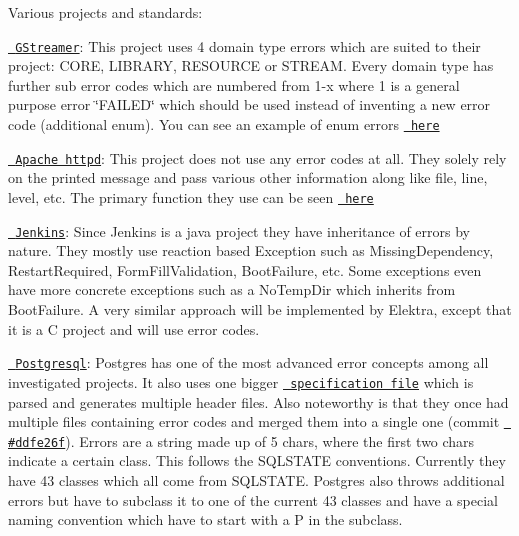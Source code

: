 Various projects and standards\+:


\begin{DoxyItemize}
\item \href{https://github.com/GStreamer/gstreamer}{\texttt{ G\+Streamer}}\+: This project uses 4 domain type errors which are suited to their project\+: C\+O\+RE, L\+I\+B\+R\+A\+RY, R\+E\+S\+O\+U\+R\+CE or S\+T\+R\+E\+AM. Every domain type has further sub error codes which are numbered from 1-\/x where 1 is a general purpose error \char`\"{}\+F\+A\+I\+L\+E\+D\char`\"{} which should be used instead of inventing a new error code (additional enum). You can see an example of enum errors \href{https://github.com/GStreamer/gstreamer/blob/a7db80f9a98287f012108845e121f6f6fb62171b/gst/gsterror.h\#L63-L80}{\texttt{ here}}
\item \href{https://github.com/apache/httpd}{\texttt{ Apache httpd}}\+: This project does not use any error codes at all. They solely rely on the printed message and pass various other information along like file, line, level, etc. The primary function they use can be seen \href{https://github.com/apache/httpd/blob/1acebd4933e5315c669605c3c9222ed8bb0ee9ea/include/http_log.h\#L378-L403}{\texttt{ here}}
\item \href{https://github.com/jenkinsci/jenkins}{\texttt{ Jenkins}}\+: Since Jenkins is a java project they have inheritance of errors by nature. They mostly use reaction based Exception such as {\ttfamily Missing\+Dependency}, {\ttfamily Restart\+Required}, {\ttfamily Form\+Fill\+Validation}, {\ttfamily Boot\+Failure}, etc. Some exceptions even have more concrete exceptions such as a {\ttfamily No\+Temp\+Dir} which inherits from {\ttfamily Boot\+Failure}. A very similar approach will be implemented by Elektra, except that it is a C project and will use error codes.
\item \href{https://github.com/postgres/postgres}{\texttt{ Postgresql}}\+: Postgres has one of the most advanced error concepts among all investigated projects. It also uses one bigger \href{https://github.com/postgres/postgres/blob/master/src/backend/utils/errcodes.txt}{\texttt{ specification file}} which is parsed and generates multiple header files. Also noteworthy is that they once had multiple files containing error codes and merged them into a single one (commit \href{https://github.com/postgres/postgres/commit/ddfe26f6441c24660595c5efe5fd0bd3974cdc5c}{\texttt{ \#ddfe26f}}). Errors are a string made up of 5 chars, where the first two chars indicate a certain class. This follows the S\+Q\+L\+S\+T\+A\+TE conventions. Currently they have 43 classes which all come from S\+Q\+L\+S\+T\+A\+TE. Postgres also throws additional errors but have to subclass it to one of the current 43 classes and have a special naming convention which have to start with a {\ttfamily P} in the subclass.

\end{DoxyItemize}
